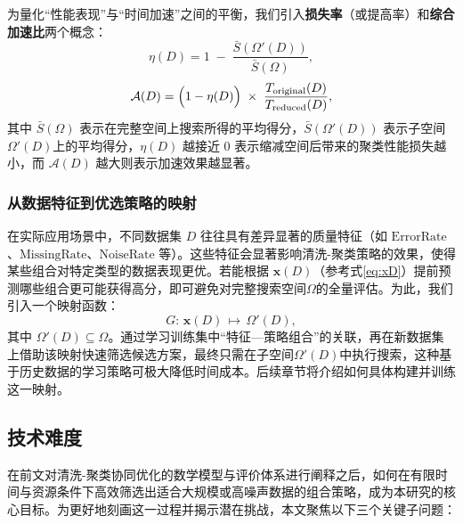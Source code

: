 \documentclass[10pt]{article} %
\numberwithin{equation}{section}
\begin{document}
为量化“性能表现”与“时间加速”之间的平衡，我们引入\textbf{损失率}（或提高率）和\textbf{综合加速比}两个概念：
\begin{equation}\label{eq:loss-rate}
  \eta(D)
  =
  1 \;-\;
  \frac{\bar{S}(\Omega'(D))}{\bar{S}(\Omega)},
\end{equation}
\begin{equation}\label{eq:acc-ratio}
  \mathcal{A}(D)
  =
  \Bigl(1 - \eta(D)\Bigr)
  \;\times\;
  \frac{T_{\text{original}}(D)}{T_{\text{reduced}}(D)},
\end{equation}
其中 \(\bar{S}(\Omega)\) 表示在完整空间上搜索所得的平均得分，\(\bar{S}(\Omega'(D))\) 表示子空间\(\Omega'(D)\)上的平均得分，\(\eta(D)\) 越接近 0 表示缩减空间后带来的聚类性能损失越小，而 \(\mathcal{A}(D)\) 越大则表示加速效果越显著。

\subsubsection{从数据特征到优选策略的映射}
在实际应用场景中，不同数据集 \(D\) 往往具有差异显著的质量特征（如 \(\mathrm{ErrorRate}\)、\(\mathrm{MissingRate}\)、\(\mathrm{NoiseRate}\) 等）。这些特征会显著影响清洗-聚类策略的效果，使得某些组合对特定类型的数据表现更优。若能根据 \(\mathbf{x}(D)\)（参考式\eqref{eq:xD}）提前预测哪些组合更可能获得高分，即可避免对完整搜索空间\(\Omega\)的全量评估。为此，我们引入一个映射函数：
\begin{equation}\label{eq:Omega-prime}
  G:\, \mathbf{x}(D)\,\mapsto\, \Omega'(D),
\end{equation}
其中 \(\Omega'(D)\subseteq \Omega\)。通过学习训练集中“特征—策略组合”的关联，再在新数据集上借助该映射快速筛选候选方案，最终只需在子空间\(\Omega'(D)\)中执行搜索，这种基于历史数据的学习策略可极大降低时间成本\cite{10.14778/3407790.3407801}。后续章节将介绍如何具体构建并训练这一映射。

\subsection{技术难度}\label{subsec:problem-statement}

在前文对清洗-聚类协同优化的数学模型与评价体系进行阐释之后，如何在有限时间与资源条件下高效筛选出适合大规模或高噪声数据的组合策略，成为本研究的核心目标。为更好地刻画这一过程并揭示潜在挑战，本文聚焦以下三个关键子问题：
\end{document}
